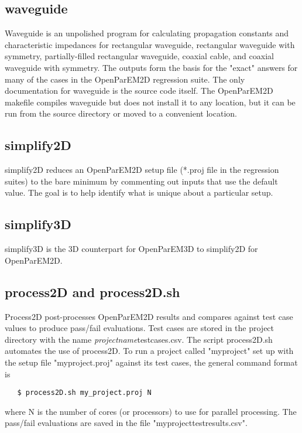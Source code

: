 \documentclass[titlepage]{article}
\renewcommand\_{\textunderscore\linebreak[1]}
\begin{document}
\subsection{waveguide}

Waveguide is an unpolished program for calculating propagation constants and characteristic impedances for rectangular waveguide, rectangular waveguide with symmetry, partially-filled rectangular waveguide, coaxial cable, and coaxial waveguide with symmetry.  The outputs form the basis for the "exact" answers for many of the cases in the OpenParEM2D regression suite.  The only documentation for waveguide is the source code itself.  The OpenParEM2D makefile compiles waveguide but does not install it to any location, but it can be run from the source directory or moved to a convenient location.

\subsection{simplify2D}

simplify2D reduces an OpenParEM2D setup file (*.proj file in the regression suites) to the bare minimum by commenting out inputs that use the default value.  The goal is to help identify what is unique about a particular setup.

\subsection{simplify3D}

simplify3D is the 3D counterpart for OpenParEM3D to simplify2D for OpenParEM2D.

\subsection{process2D and process2D.sh}

Process2D post-processes OpenParEM2D results and compares against test case values to produce pass/fail evaluations.  Test cases are stored in the project directory with the name \textit{project\_name}\_test\_cases.csv.  The script process2D.sh automates the use of process2D.  To run a project called "my\_project" set up with the setup file "my\_project.proj" against its test cases, the general command format is

\begin{verbatim}
   $ process2D.sh my_project.proj N
\end{verbatim}
\noindent where N is the number of cores (or processors) to use for parallel processing.  The pass/fail evaluations are saved in the file "my\_project\_test\_results.csv".
\end{document}
